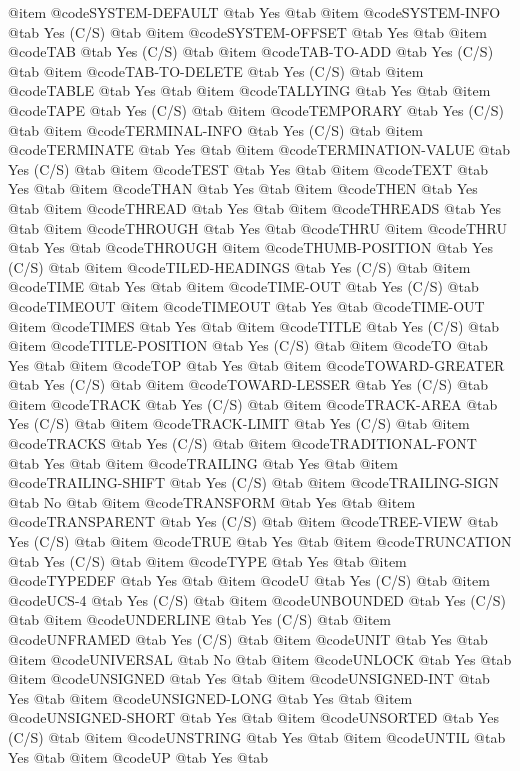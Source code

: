 @item @code{SYSTEM-DEFAULT} @tab Yes @tab 
@item @code{SYSTEM-INFO} @tab Yes	(C/S) @tab 
@item @code{SYSTEM-OFFSET} @tab Yes @tab 
@item @code{TAB} @tab Yes	(C/S) @tab 
@item @code{TAB-TO-ADD} @tab Yes	(C/S) @tab 
@item @code{TAB-TO-DELETE} @tab Yes	(C/S) @tab 
@item @code{TABLE} @tab Yes @tab 
@item @code{TALLYING} @tab Yes @tab 
@item @code{TAPE} @tab Yes	(C/S) @tab 
@item @code{TEMPORARY} @tab Yes	(C/S) @tab 
@item @code{TERMINAL-INFO} @tab Yes	(C/S) @tab 
@item @code{TERMINATE} @tab Yes @tab 
@item @code{TERMINATION-VALUE} @tab Yes	(C/S) @tab 
@item @code{TEST} @tab Yes @tab 
@item @code{TEXT} @tab Yes @tab 
@item @code{THAN} @tab Yes @tab 
@item @code{THEN} @tab Yes @tab 
@item @code{THREAD} @tab Yes @tab 
@item @code{THREADS} @tab Yes @tab 
@item @code{THROUGH} @tab Yes @tab @code{THRU}
@item @code{THRU} @tab Yes @tab @code{THROUGH}
@item @code{THUMB-POSITION} @tab Yes	(C/S) @tab 
@item @code{TILED-HEADINGS} @tab Yes	(C/S) @tab 
@item @code{TIME} @tab Yes @tab 
@item @code{TIME-OUT} @tab Yes	(C/S) @tab @code{TIMEOUT}
@item @code{TIMEOUT} @tab Yes @tab @code{TIME-OUT}
@item @code{TIMES} @tab Yes @tab 
@item @code{TITLE} @tab Yes	(C/S) @tab 
@item @code{TITLE-POSITION} @tab Yes	(C/S) @tab 
@item @code{TO} @tab Yes @tab 
@item @code{TOP} @tab Yes @tab 
@item @code{TOWARD-GREATER} @tab Yes	(C/S) @tab 
@item @code{TOWARD-LESSER} @tab Yes	(C/S) @tab 
@item @code{TRACK} @tab Yes	(C/S) @tab 
@item @code{TRACK-AREA} @tab Yes	(C/S) @tab 
@item @code{TRACK-LIMIT} @tab Yes	(C/S) @tab 
@item @code{TRACKS} @tab Yes	(C/S) @tab 
@item @code{TRADITIONAL-FONT} @tab Yes @tab 
@item @code{TRAILING} @tab Yes @tab 
@item @code{TRAILING-SHIFT} @tab Yes	(C/S) @tab 
@item @code{TRAILING-SIGN} @tab No @tab 
@item @code{TRANSFORM} @tab Yes @tab 
@item @code{TRANSPARENT} @tab Yes	(C/S) @tab 
@item @code{TREE-VIEW} @tab Yes	(C/S) @tab 
@item @code{TRUE} @tab Yes @tab 
@item @code{TRUNCATION} @tab Yes	(C/S) @tab 
@item @code{TYPE} @tab Yes @tab 
@item @code{TYPEDEF} @tab Yes @tab 
@item @code{U} @tab Yes	(C/S) @tab 
@item @code{UCS-4} @tab Yes	(C/S) @tab 
@item @code{UNBOUNDED} @tab Yes	(C/S) @tab 
@item @code{UNDERLINE} @tab Yes	(C/S) @tab 
@item @code{UNFRAMED} @tab Yes	(C/S) @tab 
@item @code{UNIT} @tab Yes @tab 
@item @code{UNIVERSAL} @tab No @tab 
@item @code{UNLOCK} @tab Yes @tab 
@item @code{UNSIGNED} @tab Yes @tab 
@item @code{UNSIGNED-INT} @tab Yes @tab 
@item @code{UNSIGNED-LONG} @tab Yes @tab 
@item @code{UNSIGNED-SHORT} @tab Yes @tab 
@item @code{UNSORTED} @tab Yes	(C/S) @tab 
@item @code{UNSTRING} @tab Yes @tab 
@item @code{UNTIL} @tab Yes @tab 
@item @code{UP} @tab Yes @tab 
